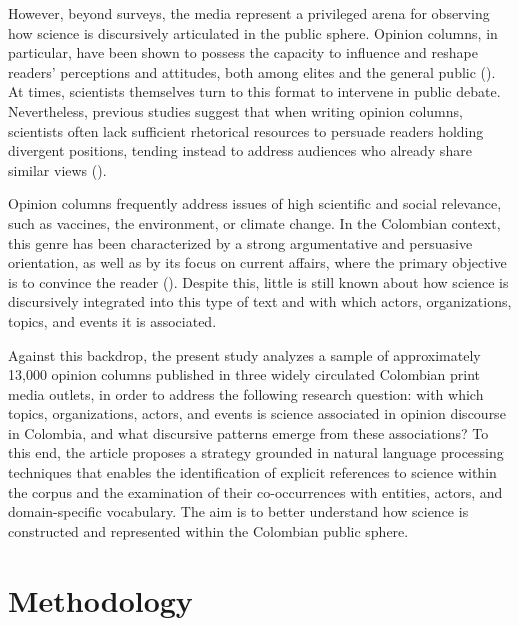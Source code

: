 \documentclass[pdflatex,sn-mathphys-num,iicol]{sn-jnl}
\begin{document}
	However, beyond surveys, the media represent a privileged arena for observing how science is discursively articulated in the public sphere. Opinion columns, in particular, have been shown to possess the capacity to influence and reshape readers’ perceptions and attitudes, both among elites and the general public (\cite{Coppock2018}). At times, scientists themselves turn to this format to intervene in public debate. Nevertheless, previous studies suggest that when writing opinion columns, scientists often lack sufficient rhetorical resources to persuade readers holding divergent positions, tending instead to address audiences who already share similar views (\cite{Syfert2025}).
	
	Opinion columns frequently address issues of high scientific and social relevance, such as vaccines, the environment, or climate change. In the Colombian context, this genre has been characterized by a strong argumentative and persuasive orientation, as well as by its focus on current affairs, where the primary objective is to convince the reader (\cite{CaroLopera2020}). Despite this, little is still known about how science is discursively integrated into this type of text and with which actors, organizations, topics, and events it is associated.


	Against this backdrop, the present study analyzes a sample of approximately 13,000 opinion columns published in three widely circulated Colombian print media outlets, in order to address the following research question: with which topics, organizations, actors, and events is science associated in opinion discourse in Colombia, and what discursive patterns emerge from these associations? To this end, the article proposes a strategy grounded in natural language processing techniques that enables the identification of explicit references to science within the corpus and the examination of their co-occurrences with entities, actors, and domain-specific vocabulary. The aim is to better understand how science is constructed and represented within the Colombian public sphere.
	
	\section{Methodology}\label{sec:methodology}
	
\end{document}
